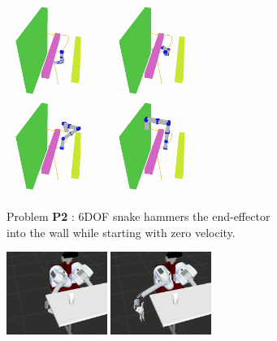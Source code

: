 \documentclass[letterpaper, 10 pt, conference]{ieeeconf}  %
\begin{document}
\begin{figure}[t!]
\begin{subfigure}[b]{\textwidth}
		\includegraphics[height=3cm]{fig/planning_efficiency/6dof_2}
		\includegraphics[height=3cm]{fig/planning_efficiency/6dof_3}
		\includegraphics[height=3cm]{fig/planning_efficiency/6dof_4}
		\includegraphics[height=3cm]{fig/planning_efficiency/6dof_5}
		\caption{\captionstyle Problem \textbf{P2} : 6DOF snake hammers the end-effector into the wall while starting with zero velocity.}
		\vspace{6pt}
		\label{fig:planning_efficiency:6dof:example}
	\end{subfigure}
	\begin{subfigure}[b]{\textwidth}
    \centering
    \includegraphics[height=2.7cm]{fig/planning_efficiency/herb_batting_1}
    \includegraphics[height=2.7cm]{fig/planning_efficiency/herb_batting_2}

\end{subfigure}
\end{figure}
\end{document}
